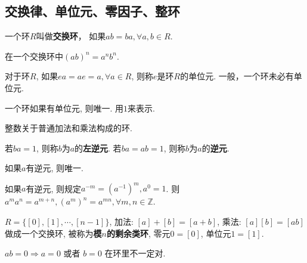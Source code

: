 \subsection{交换律、单位元、零因子、整环}

\begin{Definition}[交换环]
一个环$R$叫做\textbf{交换环}， 如果$ab = ba,  \forall a, b \in R$.
\end{Definition}

\begin{Proposition}
在一个交换环中${(ab)}^n = a^n b^n$.
\end{Proposition}

\begin{Definition}[单位元]
对于环$R$, 如果$ea = ae = a, \forall a \in R$, 则称$e$是环$R$的单位元. 一般，一个环未必有单位元.
\end{Definition}

\begin{Proposition}
一个环如果有单位元, 则唯一. 用$\mathfrak{1}$来表示.
\end{Proposition}

\begin{Definition}[整数环]
整数关于普通加法和乘法构成的环.
\end{Definition}

\begin{Definition}[逆元]
若$ba = \mathfrak{1}$, 则称$b$为$a$的\textbf{左逆元}. 若$ba = ab = \mathfrak{1}$, 则称$b$为$a$的\textbf{逆元}. 
\end{Definition}

\begin{Proposition}
如果$a$有逆元, 则唯一.
\end{Proposition}

\begin{Proposition}
如果$a$有逆元, 则规定$a^{-m} = {(a^{-1})}^m, a^0 = \mathfrak{1}$. 则$a^m a^n = a^{m+n}, {(a^m)}^n = a^{mn}, \forall m, n \in \mathbb{Z}$.
\end{Proposition}

\begin{Proposition}[模$n$的剩余类环]
$R = \{ [0], [1], \cdots, [n-1] \}$, 加法: $[a] + [b] = [a+b]$, 乘法: $[a][b] = [ab]$做成一个交换环, 被称为\textbf{模$n$的剩余类环}, 零元$\mathfrak{0} = [0]$, 单位元$\mathfrak{1} = [1]$.
\end{Proposition}

\begin{Proposition}
$ab = \mathfrak{0} \Rightarrow a = \mathfrak{0} $ 或者 $b = \mathfrak{0}$ 在环里不一定对.
\end{Proposition}

